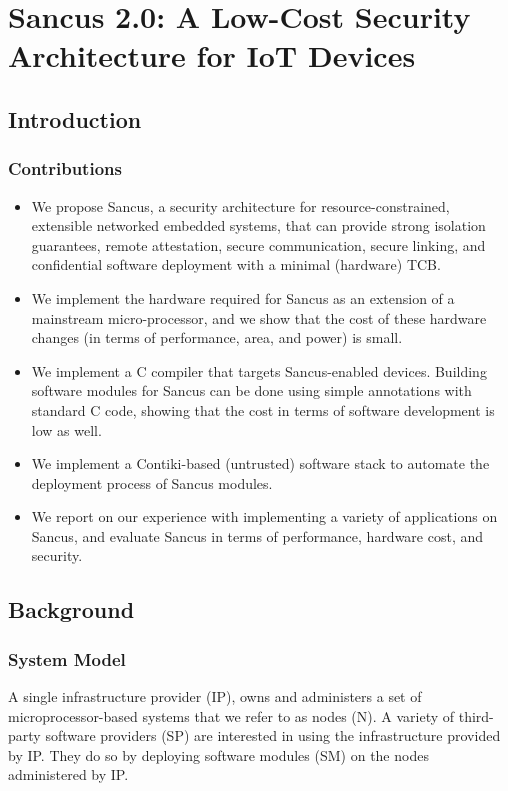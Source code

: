 \documentclass{article}
\begin{document}
\section{Sancus 2.0: A Low-Cost Security Architecture for IoT Devices}

\subsection{Introduction}

\subsubsection{Contributions}

\begin{itemize}
\item We propose Sancus, a security architecture for resource-constrained, extensible networked embedded systems, that can provide strong isolation guarantees, remote attestation, secure communication, secure linking, and confidential software deployment with a minimal (hardware) TCB.
\item We implement the hardware required for Sancus as an extension of a mainstream micro-processor, and we show that the cost of these hardware changes (in terms of performance, area, and power) is small.
\item We implement a C compiler that targets Sancus-enabled devices. Building software modules for Sancus can be done using simple annotations with standard C code, showing that the cost in terms of software development is low as well.
\item We implement a Contiki-based (untrusted) software stack to automate the deployment process of Sancus modules.
\item We report on our experience with implementing a variety of applications on Sancus, and evaluate Sancus in terms of performance, hardware cost, and security.
\end{itemize}

\subsection{Background}

\subsubsection{System Model}

A single infrastructure provider (IP), owns and administers a set of microprocessor-based systems that we refer to as nodes (N). A variety of third-party software providers (SP) are interested in using the infrastructure provided by IP. They do so by deploying software modules (SM) on the nodes administered by IP.
\end{document}
